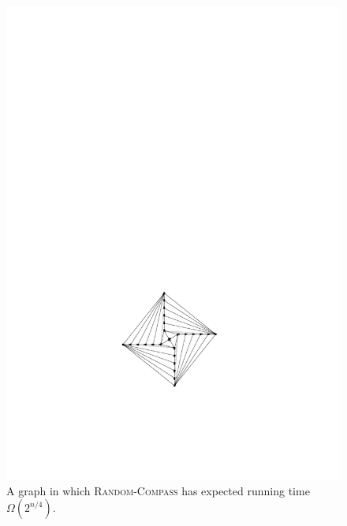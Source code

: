 \documentclass [letterpaper] {patmorin}
\begin{document}
\begin{figure}
  \begin{center}
    \includegraphics{pics/bad-unbiased}
  \end{center}
  \caption{A graph in which \textsc{Random-Compass} has expected running time 
           $\Omega(2^{n/4})$.}
  \label{fig:bad-unbiased}
\end{figure}
\end{document}
